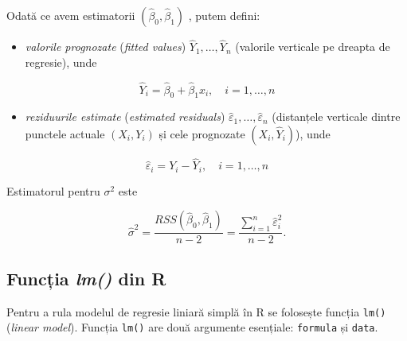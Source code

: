\documentclass[]{article}
\providecommand{\tightlist}{%
  \setlength{\itemsep}{0pt}\setlength{\parskip}{0pt}}
\begin{document}
Odată ce avem estimatorii \((\hat\beta_0,\hat\beta_1)\) , putem defini:

\begin{itemize}
\tightlist
\item
  \emph{valorile prognozate} (\emph{fitted values})
  \(\hat Y_1,\ldots,\hat Y_n\) (valorile verticale pe dreapta de
  regresie), unde
\end{itemize}

\[
\hat Y_i=\hat\beta_0+\hat\beta_1x_i,\quad i=1,\ldots,n
\]

\begin{itemize}
\tightlist
\item
  \emph{reziduurile estimate} (\emph{estimated residuals})
  \(\hat \varepsilon_1,\ldots,\hat \varepsilon_n\) (distanțele verticale
  dintre punctele actuale \((X_i,Y_i)\) și cele prognozate
  \((X_i,\hat Y_i)\)), unde
\end{itemize}

\[
\hat\varepsilon_i=Y_i-\hat Y_i,\quad i=1,\ldots,n
\]

Estimatorul pentru \(\sigma^2\) este

\[
\hat{\sigma}^2 = \frac{RSS(\hat{\beta}_0,\hat{\beta}_1)}{n-2} = \frac{\sum_{i=1}^{n}\hat{\varepsilon}_i^2}{n-2}.
\]

\subsection{\texorpdfstring{Funcția \emph{lm()} din
R}{Funcția lm() din R}}\label{functia-lm-din-r}

Pentru a rula modelul de regresie liniară simplă în R se folosește
funcția \texttt{lm()} (\emph{linear model}). Funcția \texttt{lm()} are
două argumente esențiale: \texttt{formula} și \texttt{data}.
\end{document}
